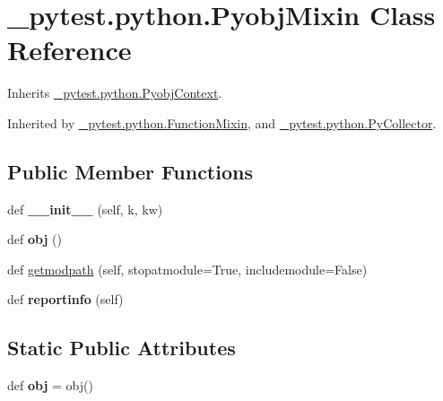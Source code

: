 \hypertarget{class__pytest_1_1python_1_1_pyobj_mixin}{}\section{\+\_\+pytest.\+python.\+Pyobj\+Mixin Class Reference}
\label{class__pytest_1_1python_1_1_pyobj_mixin}


Inherits \hyperlink{class__pytest_1_1python_1_1_pyobj_context}{\+\_\+pytest.\+python.\+Pyobj\+Context}.



Inherited by \hyperlink{class__pytest_1_1python_1_1_function_mixin}{\+\_\+pytest.\+python.\+Function\+Mixin}, and \hyperlink{class__pytest_1_1python_1_1_py_collector}{\+\_\+pytest.\+python.\+Py\+Collector}.

\subsection*{Public Member Functions}
\begin{DoxyCompactItemize}
\item 
\mbox{\label{class__pytest_1_1python_1_1_pyobj_mixin_a684b9473b00fda31935ca406b69072dd}} 
def {\bfseries \+\_\+\+\_\+init\+\_\+\+\_\+} (self, k, kw)
\item 
\mbox{\label{class__pytest_1_1python_1_1_pyobj_mixin_ae3cc384960312b0672b0d72f87489ed0}} 
def {\bfseries obj} ()
\item 
def \hyperlink{class__pytest_1_1python_1_1_pyobj_mixin_a0c86ecade728ecda3f0ea80681a8b50a}{getmodpath} (self, stopatmodule=True, includemodule=False)
\item 
\mbox{\label{class__pytest_1_1python_1_1_pyobj_mixin_a2f015442a38bf16d32067c8bdba0946a}} 
def {\bfseries reportinfo} (self)
\end{DoxyCompactItemize}
\subsection*{Static Public Attributes}
\begin{DoxyCompactItemize}
\item 
\mbox{\label{class__pytest_1_1python_1_1_pyobj_mixin_a2994158864cd6499a5e011c10c9efac3}} 
def {\bfseries obj} = obj()
\end{DoxyCompactItemize}


